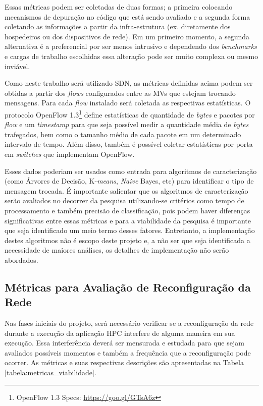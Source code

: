 \documentclass[10pt, conference, compsocconf]{IEEEtran}
\begin{document}
Essas métricas podem ser coletadas de duas formas; a primeira colocando mecanismos de depuração no código que está sendo avaliado e a segunda forma coletando as informações a partir da infra-estrutura (ex. diretamente dos hospedeiros ou dos dispositivos de rede). Em um primeiro momento, a segunda alternativa é a preferencial por ser menos intrusivo e dependendo dos \textit{benchmarks} e cargas de trabalho escolhidas essa alteração pode ser muito complexa ou mesmo inviável.

Como neste trabalho será utilizado SDN, as métricas definidas acima podem ser obtidas a partir dos \textit{flows} configurados entre as MVs que estejam trocando mensagens. Para cada \textit{flow} instalado será coletada as respectivas estatísticas. O protocolo OpenFlow 1.3\footnote{OpenFlow 1.3 Specs: \url{https://goo.gl/GTsA6z}} define estatísticas de quantidade de \textit{bytes} e pacotes por \textit{flow} e um \textit{timestamp} para que seja possível medir a quantidade média de \textit{bytes} trafegados, bem como o tamanho médio de cada pacote em um determinado intervalo de tempo. Além disso, também é possível coletar estatísticas por porta em \textit{switches} que implementam OpenFlow.

Esses dados poderiam ser usados como entrada para algoritmos de caracterização (como Árvores de Decisão, K-\textit{means}, \textit{Naive} Bayes, etc) para identificar o tipo de mensagem trocada. É importante salientar que os algoritmos de caracterização serão avaliados no decorrer da pesquisa utilizando-se critérios como tempo de processamento e também precisão de classificação, pois podem haver diferenças significativas entre essas métricas e para a viabilidade da pesquisa é importante que seja identificado um meio termo desses fatores. Entretanto, a implementação destes algoritmos não é escopo deste projeto e, a não ser que seja identificada a necessidade de maiores análises, os detalhes de implementação não serão abordados.

\subsection{Métricas para Avaliação de Reconfiguração da Rede}
Nas fases iniciais do projeto, será necessário verificar se a reconfiguração da rede durante a execução da aplicação HPC interfere de alguma maneira em sua execução. Essa interferência deverá ser mensurada e estudada para que sejam avaliados possíveis momentos e também a frequência que a reconfiguração pode ocorrer. As métricas e suas respectivas descrições são apresentadas na Tabela \ref{tabela:metricas_viabilidade}. 
\end{document}
